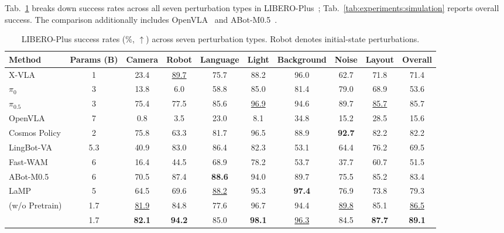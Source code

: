 Tab.~\ref{tab:experiments:libero_plus} breaks down success rates across
all seven perturbation types in LIBERO-Plus~\citep{fei2025liberoplus};
Tab.~\ref{tab:experiments:simulation} reports overall success.
The comparison additionally includes OpenVLA~\citep{kim2024openvla}
and ABot-M0.5~\citep{chen2026abotm05}.

\begin{table}[!htbp]
    \centering
    \small
    \setlength{\tabcolsep}{3pt}
    \renewcommand{\arraystretch}{1.10}
    \caption{LIBERO-Plus success rates (\%, $\uparrow$) across seven
    perturbation types. Robot denotes initial-state perturbations.}
    \label{tab:experiments:libero_plus}
    \vspace{3pt}
    \begin{adjustbox}{max width=\linewidth}
    \begin{tabular}{@{}lccccccccc@{}}
        \toprule
        Method & Params (B) & Camera & Robot & Language & Light
        & Background & Noise & Layout & Overall \\
        \midrule
        X-VLA & 1 & 23.4 & \underline{89.7} & 75.7 & 88.2 & 96.0 & 62.7 & 71.8 & 71.4 \\
        $\pi_{0}$ & 3 & 13.8 & 6.0 & 58.8 & 85.0 & 81.4 & 79.0 & 68.9 & 53.6 \\
        $\pi_{0.5}$ & 3 & 75.4 & 77.5 & 85.6 & \underline{96.9} & 94.6 & 89.7 & \underline{85.7} & 85.7 \\
        OpenVLA & 7 & 0.8 & 3.5 & 23.0 & 8.1 & 34.8 & 15.2 & 28.5 & 15.6 \\
        Cosmos Policy & 2 & 75.8 & 63.3 & 81.7 & 96.5 & 88.9 & \textbf{92.7} & 82.2 & 82.2 \\
        LingBot-VA & 5.3 & 40.9 & 83.0 & 86.4 & 82.3 & 53.1 & 64.4 & 76.2 & 69.5 \\
        Fast-WAM & 6 & 16.4 & 44.5 & 68.9 & 78.2 & 53.7 & 37.7 & 60.7 & 51.5 \\
        ABot-M0.5 & 6 & 70.5 & 87.4 & \textbf{88.6} & 94.0 & 89.7 & 75.5 & 85.2 & 83.4 \\
        LaMP & 5 & 64.5 & 69.6 & \underline{88.2} & 95.3 & \textbf{97.4} & 76.9 & 73.8 & 79.3 \\
        \midrule
        \method{} (w/o Pretrain) & 1.7 & \underline{81.9} & 84.8 & 77.6 & 96.7 & 94.4 & \underline{89.8} & 85.1 & \underline{86.5} \\
        \method{} & 1.7 & \textbf{82.1} & \textbf{94.2} & 85.0 & \textbf{98.1} & \underline{96.3} & 84.5 & \textbf{87.7} & \textbf{89.1} \\
        \bottomrule
    \end{tabular}
    \end{adjustbox}
\end{table}


